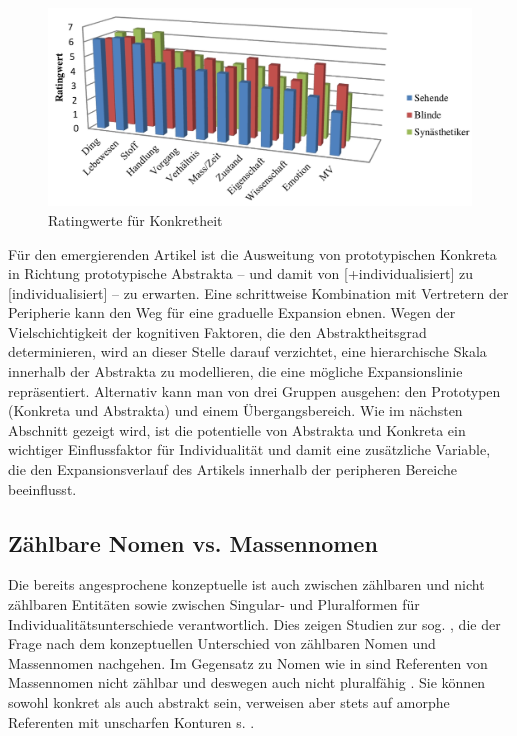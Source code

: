 \begin{figure}
\begin{center}
\includegraphics[width=12cm]{images/rating-konkret-abstrakt-schrauf-neu.jpg}
\caption {Ratingwerte für Konkretheit \parencite[Darstellung aus][162]{Schrauf2011}}
\label{abb:schrauf-rating}
\end{center}
\end{figure}

Für den emergierenden Artikel ist die Ausweitung von prototypischen Konkreta in Richtung prototypische Abstrakta -- und damit von [+individualisiert] zu [\textminus{}individualisiert] -- zu erwarten. Eine schrittweise Kombination mit Vertretern der Peripherie kann den Weg für eine graduelle Expansion ebnen. Wegen der Vielschichtigkeit der kognitiven Faktoren, die den Abstraktheitsgrad determinieren, wird an dieser Stelle darauf verzichtet, eine hierarchische Skala innerhalb der  Abstrakta zu modellieren, die eine mögliche Expansionslinie repräsentiert. Alternativ kann man von drei Gruppen ausgehen: den Prototypen (Konkreta und Abstrakta) und einem Übergangsbereich. Wie im nächsten Abschnitt gezeigt wird, ist die potentielle  von Abstrakta und Konkreta ein wichtiger Einflussfaktor für Individualität und damit eine zusätzliche Variable, die den Expansionsverlauf des Artikels innerhalb der peripheren Bereiche beeinflusst.  

\subsection{Zählbare Nomen vs. Massennomen}\label{section:mass}

Die bereits angesprochene konzeptuelle  ist auch zwischen zählbaren und nicht zählbaren Entitäten sowie zwischen Singular- und Pluralformen für Individualitätsunterschiede verantwortlich. Dies zeigen Studien zur sog.  \parencite[s.][]{Jackendoff1991, Langacker1991, Bisle-Muller1991, Rijkhoff1991,Rijkhoff2002, Corbett2000, Massam2012,Zifonun2012}, die der Frage nach dem konzeptuellen Unterschied von zählbaren Nomen und Massennomen nachgehen. Im Gegensatz zu Nomen wie in  sind Referenten von Massennomen nicht zählbar und deswegen auch nicht pluralfähig \parencite[77]{Langacker1991}. Sie können sowohl konkret als auch abstrakt sein, verweisen aber stets auf amorphe Referenten mit unscharfen Konturen s. . 

